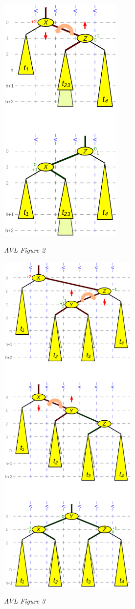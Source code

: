 \documentclass[12pt]{article}
\begin{document}
	\begin{minipage}[b]{0.5\textwidth}
		\centering
		\includegraphics[height=125mm]{img/avl2.png}
		
		\textit{AVL Figure 2}
	\end{minipage}\hspace{3mm}
	\begin{minipage}[b]{0.5\textwidth}
		\centering
		\includegraphics[height=175mm]{img/avl3.png}
		
		\textit{AVL Figure 3}
	\end{minipage}\hspace{3mm}
\end{document}
